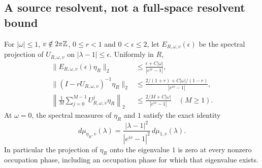 \subsection{A source resolvent, not a full-space resolvent bound}
\begin{theorem}
\label{thm:v39-section-source}
For $|\omega|\le1$, $v\notin2\pi\mathbb Z$, $0\le r<1$ and
$0<\epsilon\le2$, let $E_{R,\omega,v}(\epsilon)$ be the spectral
projection of $U_{R,\omega,v}$ on $|\lambda-1|\le\epsilon$.
Uniformly in $R$,
\begin{align}
 \|E_{R,\omega,v}(\epsilon)\eta_R\|_2
 &\le\frac{\epsilon+C|\omega|}{|e^{iv}-1|},
                                  \label{eq:v39-source-spectral-window}\\
 \|(I-rU_{R,\omega,v})^{-1}\eta_R\|_2
 &\le\frac{2/(1+r)+C|\omega|/(1-r)}{|e^{iv}-1|},
                                  \label{eq:v39-source-resolvent}\\
 \left\|\frac1M\sum_{j=0}^{M-1}U_{R,\omega,v}^j\eta_R\right\|_2
 &\le\frac{2/M+C|\omega|}{|e^{iv}-1|}\quad(M\ge1).
                                  \label{eq:v39-source-cesaro}
\end{align}
At $\omega=0$, the spectral measures of $\eta_R$ and $1$ satisfy the
exact identity
\begin{equation}\label{eq:v39-source-spectral-measure}
 d\mu_{\eta_R,v}(\lambda)
   =\frac{|\lambda-1|^2}{|e^{iv}-1|^2}\,d\mu_{1,v}(\lambda).
\end{equation}
In particular the projection of $\eta_R$ onto the eigenvalue $1$
is zero at every nonzero occupation phase, including an occupation
phase for which that eigenvalue exists.
\end{theorem}
